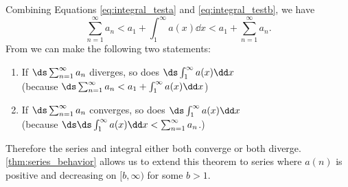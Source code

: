 Combining Equations \eqref{eq:integral_testa} and \eqref{eq:integral_testb}, we have
\begin{equation}\sum_{n=1}^\infty a_n< a_1 +\int_1^\infty a(x)\dd x < a_1 + \sum_{n=1}^\infty a_n.\label{eq:integral_testc}\end{equation}
From  we can make the following two statements:
\begin{enumerate}
	\item If $\ds \sum_{n=1}^\infty a_n$ diverges, so does $\ds\int_1^\infty a(x)\dd x$ \\\hfill(because $\ds \sum_{n=1}^\infty a_n < a_1 +\int_1^\infty a(x)\dd x$)
	\item	If $\ds \sum_{n=1}^\infty a_n$ converges, so does $\ds\int_1^\infty a(x)\dd x$ \\\hfill(because $\ds \ds \int_1^\infty a(x)\dd x < \sum_{n=1}^\infty a_n$.)
\end{enumerate}
Therefore the series and integral either both converge or both diverge. \autoref{thm:series_behavior} allows us to extend this theorem to series where $a(n)$ is positive and decreasing on $[b,\infty)$ for some $b>1$.


